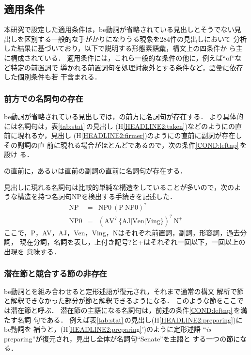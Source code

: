 \subsection{適用条件}
\label{sec:preeditHeadline:cond}

本研究で設定した適用条件は，be動詞が省略されている見出しとそうでない見
出しを区別する一般的な手がかりになりうる現象を284件の見出しにおいて
分析した結果に基づいており，以下で説明する形態素語彙，構文上の四条件か
ら主に構成されている．
適用条件には，これら一般的な条件の他に，例えば``of''など特定の前置詞で
導かれる前置詞句を処理対象外とする条件など，語彙に依存した個別条件も若
干含まれる． 

\subsubsection{\KEY 前方での名詞句の存在}

be動詞が省略されている見出しでは，\KEY の前方に名詞句が存在する．
より具体的には名詞句は，表\ref{tab:stat}\,の見出し
(H\ref{HEADLINE2:taken})などのように\KEY の直前に現れるか，見出し
(H\ref{HEADLINE2:firmer})のように\KEY の直前に副詞が存在しその副詞の直
前に現れる場合がほとんどであるので，次の条件\ref{COND:leftnp}\,を設け
る．
\begin{COND}
\cond \KEYC の直前に，あるいは\KEYC 直前の副詞の直前に名詞句が存在する．
\label{COND:leftnp}
\end{COND}

見出しに現れる名詞句は比較的単純な構造をしていることが多いので，次のよ
うな構造を持つ名詞句NPを検出する手続きを記述した．
\begin{eqnarray*}
\mbox{NP} &=& \mbox{NP0}\ (\mbox{P}\ \mbox{NP0})^? \\
\mbox{NP0} &=& (\mbox{AV}^?
\ \{\mbox{AJ}|\mbox{Ven}|\mbox{Ving}\})^?\ \mbox{N}^+
\end{eqnarray*}
ここで，P，AV，AJ，Ven，Ving，Nはそれぞれ前置詞，副詞，形容詞，過去分詞，
現在分詞，名詞を表し，上付き記号?と+はそれぞれ一回以下，一回以上の出現を
意味する．

\subsubsection{潜在節と競合する節の非存在}

be動詞と\KEYC を組み合わせると定形述語が復元され，それまで通常の構文
解析で節と解釈できなかった部分が節と解釈できるようになる．
このような節をここでは潜在節と呼ぶ．
潜在節の主語になる名詞句は，前述の条件\ref{COND:leftnp}\,を満たす名詞
句である．
例えば表\ref{tab:stat}\,の見出し(H\ref{HEADLINE2:preparing})にbe動詞を
補うと，(H\ref{HEADLINE2:preparing}')のように定形述語
``{\it is} preparing''が復元され，見出し全体が名詞句``Senate''を主語と
する一つの節になる．

